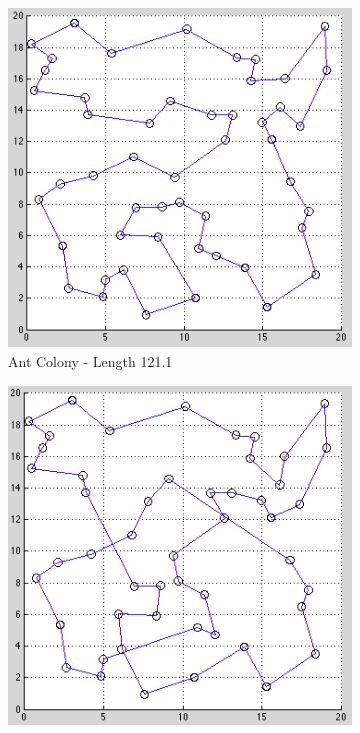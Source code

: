 \documentclass{article}
\begin{document}
\begin{figure}[!ht]
        \centering
        \begin{subfigure}[b]{0.3\textwidth}
                \includegraphics[width=\textwidth]{AC}
                \caption{Ant Colony - Length 121.1}
                \label{fig:Ant}
        \end{subfigure}
        \begin{subfigure}[b]{0.3\textwidth}
                \includegraphics[width=\textwidth]{21b}

\end{subfigure}
\end{figure}
\end{document}
